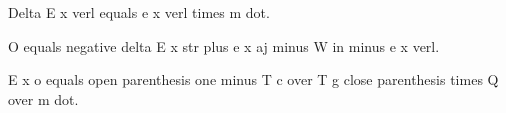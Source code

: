 Delta E x verl equals e x verl times m dot.

O equals negative delta E x str plus e x aj minus W in minus e x verl.

E x o equals open parenthesis one minus T c over T g close parenthesis times Q over m dot.